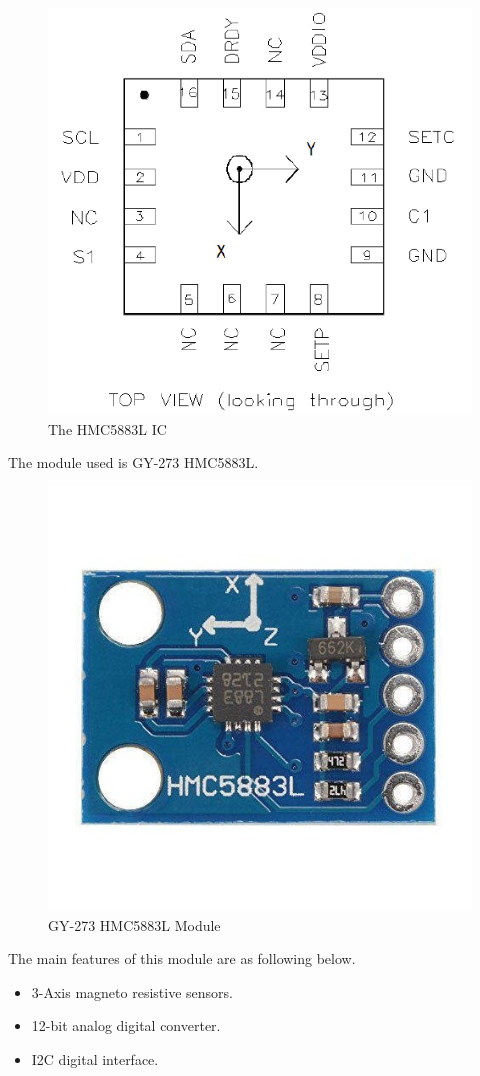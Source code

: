 \begin{figure}[h]
    \centering
    \includegraphics[scale=.6]{figures/1.png}
    \caption{The HMC5883L IC}
    \label{fig:hm5883l}
\end{figure}
\clearpage
The module used is GY-273 HMC5883L.
\begin{figure}[h]
    \centering
    \includegraphics[scale=.5]{figures/2.jpeg}
    \caption{GY-273 HMC5883L Module}
\end{figure}
The main features of this module are as following below.
\begin{itemize}
    \item 3-Axis magneto resistive sensors.
    \item 12-bit analog digital converter.
    \item I2C digital interface.
\end{itemize}

